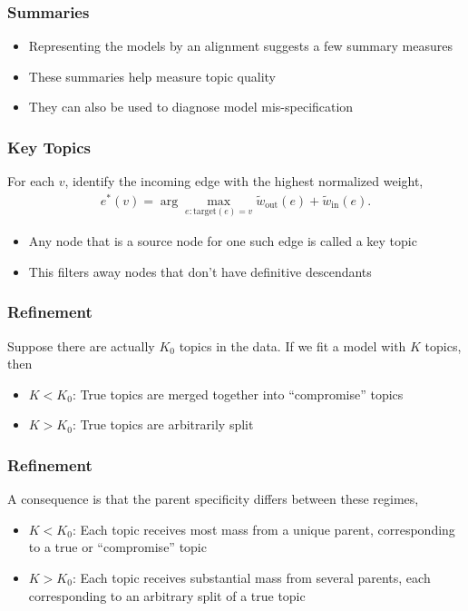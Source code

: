 \documentclass{beamer}
\begin{document}
\begin{frame}
  \frametitle{Summaries}
  \begin{itemize}
    \item Representing the models by an alignment suggests a few summary measures
    \item These summaries help measure topic quality
    \item They can also be used to diagnose model mis-specification
  \end{itemize}
\end{frame}

\begin{frame}
  \frametitle{Key Topics}
  For each $v$, identify the incoming edge with the highest normalized weight,
  \begin{align*}
    e^\ast\left(v\right) = \arg \max_{e : \text{target}\left(e\right) = v} \tilde{w}_{\text{out}}\left(e\right) + \tilde{w}_{\text{in}}\left(e\right).
  \end{align*}
  \begin{itemize}
    \item Any node that is a source node for one such edge is called a key topic
    \item This filters away nodes that don't have definitive descendants
  \end{itemize}
\end{frame}

\begin{frame}
  \frametitle{Refinement}
  Suppose there are actually $K_0$ topics in the data. If we fit a model with
  $K$ topics, then
  \begin{itemize}
    \item $K < K_0$: True topics are merged together into ``compromise'' topics
    \item $K > K_0$: True topics are arbitrarily split
  \end{itemize}
\end{frame}

\begin{frame}
  \frametitle{Refinement}
  A consequence is that the parent specificity differs between these
  regimes,
  \begin{itemize}
    \item $K < K_0$: Each topic receives most mass from a unique parent,
    corresponding to a true or ``compromise'' topic
    \item $K > K_0$: Each topic receives substantial mass from several parents,
    each corresponding to an arbitrary split of a true topic
  \end{itemize}
\end{frame}
\end{document}
